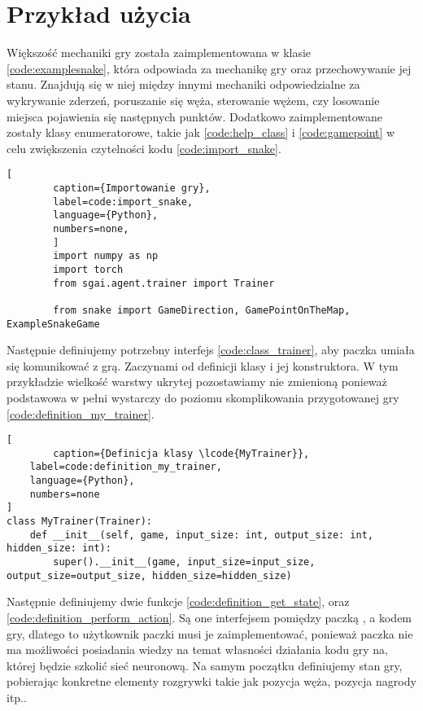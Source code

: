 \clearpage

\section{Przykład użycia}

Większość mechaniki gry została zaimplementowana w klasie  \ref{code:examplesnake}, która odpowiada za mechanikę gry oraz przechowywanie jej stanu. Znajdują się w niej między innymi mechaniki odpowiedzialne za wykrywanie zderzeń, poruszanie się węża, sterowanie wężem, czy losowanie miejsca pojawienia się następnych punktów. Dodatkowo zaimplementowane zostały klasy enumeratorowe, takie jak  \ref{code:help_class} i  \ref{code:gamepoint} w celu zwiększenia czytelności kodu \ref{code:import_snake}.

\begin{onepage}
    \begin{lstlisting}[
        caption={Importowanie gry},
        label=code:import_snake,
        language={Python},
        numbers=none,
        ]
        import numpy as np
        import torch
        from sgai.agent.trainer import Trainer
        
        from snake import GameDirection, GamePointOnTheMap, ExampleSnakeGame
    \end{lstlisting}
\end{onepage}



Następnie definiujemy potrzebny interfejs  \ref{code:class_trainer}, aby paczka  umiała się komunikować z grą. Zaczynami od definicji klasy i jej konstruktora. W tym przykładzie wielkość warstwy ukrytej pozostawiamy nie zmienioną ponieważ podstawowa w pełni wystarczy do poziomu skomplikowania przygotowanej gry \ref{code:definition_my_trainer}.

\begin{onepage}
    \begin{lstlisting}[
        caption={Definicja klasy \lcode{MyTrainer}},
    label=code:definition_my_trainer,
    language={Python},
    numbers=none
]
class MyTrainer(Trainer):
    def __init__(self, game, input_size: int, output_size: int, hidden_size: int):
        super().__init__(game, input_size=input_size, output_size=output_size, hidden_size=hidden_size)
    \end{lstlisting}
\end{onepage}

Następnie definiujemy dwie funkcje  \ref{code:definition_get_state}, oraz  \ref{code:definition_perform_action}. Są one interfejsem pomiędzy paczką , a kodem gry, dlatego to użytkownik paczki musi je zaimplementować, ponieważ paczka nie ma możliwości posiadania wiedzy na temat własności działania kodu gry na, której będzie szkolić sieć neuronową. Na samym początku definiujemy stan gry, pobierając konkretne elementy rozgrywki takie jak pozycja węża, pozycja nagrody itp..

